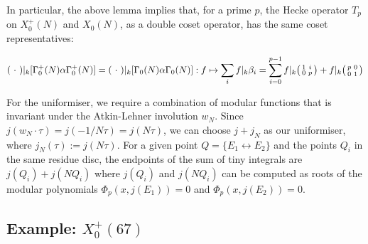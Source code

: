 In particular, the above lemma implies that, for a prime $p$, the Hecke operator $T_p$ on $X_0^+(N)$ and $X_0(N)$, as a double coset operator, has the same coset representatives:

\[
( \ \cdot \ ) |_k [ \Gamma_0^+(N) \alpha \Gamma_0^+(N)] = ( \ \cdot \ ) |_k [ \Gamma_0(N) \alpha \Gamma_0(N)]: f \mapsto \sum_i f |_k \beta_i = \sum_{i=0}^{p-1} f |_k \begin{psmallmatrix} 1 & i \\ 0 & p \end{psmallmatrix} + f|_k \begin{psmallmatrix} p & 0 \\ 0 & 1 \end{psmallmatrix}
\]

For the uniformiser, we require a combination of modular functions that is invariant under the Atkin-Lehner involution $w_N$. Since $j(w_N \cdot \tau) = j(-1/N\tau) = j(N\tau)$, we can choose $j + j_N$ as our uniformiser, where $j_N(\tau) := j(N\tau)$. For a given point $Q = \{E_1 \leftrightarrow E_2\}$ and the points $Q_i$ in the same residue disc, the endpoints of the sum of tiny integrals are $j(Q_i) + j(NQ_i)$ where $j(Q_i)$ and $j(NQ_i)$ can be computed as roots of the modular polynomials $\Phi_p(x,j(E_1)) = 0$ and $\Phi_p(x,j(E_2)) = 0$.

\subsection{Example: $X_0^+(67)$}

